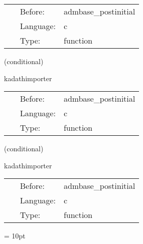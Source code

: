 \hspace{5mm}

 \begin{tabular*}{160mm}{cll} 
~ & Before:  & admbase\_postinitial \\ 
~ & Language:  & c \\ 
~ & Type:  & function \\ 
\end{tabular*} 


\vspace{5mm}

   (conditional) 

\hspace{5mm} kadathimporter 

\hspace{5mm}{\it set up neutron star initial data } 


\hspace{5mm}

 \begin{tabular*}{160mm}{cll} 
~ & Before:  & admbase\_postinitial \\ 
~ & Language:  & c \\ 
~ & Type:  & function \\ 
\end{tabular*} 


\vspace{5mm}

   (conditional) 

\hspace{5mm} kadathimporter 

\hspace{5mm}{\it set up black hole neutron star initial data } 


\hspace{5mm}

 \begin{tabular*}{160mm}{cll} 
~ & Before:  & admbase\_postinitial \\ 
~ & Language:  & c \\ 
~ & Type:  & function \\ 
\end{tabular*} 



\vspace{5mm}\parskip = 10pt 

